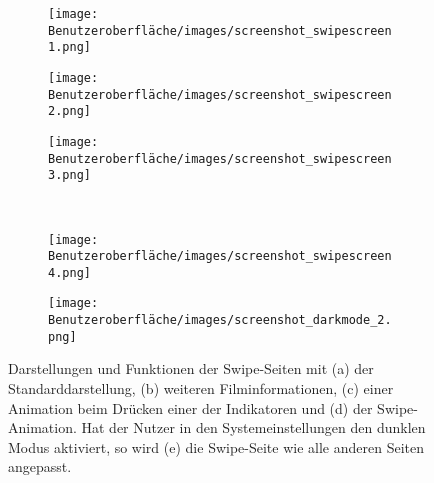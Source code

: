 \begin{figure}[H]
	\begin{subfigure}{0.33\textwidth}
	\centering
	\texttt{[image: Benutzeroberfläche/images/screenshot\_swipescreen1.png]}
	\caption{}
	\label{fig:swipescreen_a}
	\end{subfigure}
	\begin{subfigure}{0.33\textwidth}
	\centering
	\texttt{[image: Benutzeroberfläche/images/screenshot\_swipescreen2.png]}
	\caption{}
	\label{fig:swipescreen_b}
	\end{subfigure}
	\begin{subfigure}{0.33\textwidth}
	\centering
	\texttt{[image: Benutzeroberfläche/images/screenshot\_swipescreen3.png]}
	\caption{}
	\label{fig:swipescreen_c}
	\end{subfigure}\\ \vspace{1cm}	
	
	\begin{subfigure}{0.33\textwidth}
	\centering
	\texttt{[image: Benutzeroberfläche/images/screenshot\_swipescreen4.png]}
	\caption{}
	\label{fig:swipescreen_d}
	\end{subfigure}
	\begin{subfigure}{0.33\textwidth}
	\centering
	\texttt{[image: Benutzeroberfläche/images/screenshot\_darkmode\_2.png]}
	\caption{}
	\label{fig:swipescreen_e}
	\end{subfigure}
\caption[Screenshots der Swipe-Seiten]{Darstellungen und Funktionen der Swipe-Seiten mit (a) der Standarddarstellung, (b) weiteren Filminformationen, (c) einer Animation beim Drücken einer der Indikatoren und (d) der Swipe-Animation.  Hat der Nutzer in den Systemeinstellungen den dunklen Modus aktiviert, so wird (e) die Swipe-Seite wie alle anderen Seiten angepasst.}
\label{fig:swipescreen_alle}
\end{figure}
